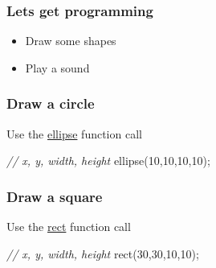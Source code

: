 \documentclass[ignorenonframetext,]{beamer}
\newenvironment{Shaded}{}{}
\newcommand{\DecValTok}[1]{\textcolor[rgb]{0.25,0.63,0.44}{{#1}}}
\newcommand{\CommentTok}[1]{\textcolor[rgb]{0.38,0.63,0.69}{\textit{{#1}}}}
\newcommand{\FunctionTok}[1]{\textcolor[rgb]{0.02,0.16,0.49}{{#1}}}
\newcommand{\NormalTok}[1]{{#1}}
\begin{document}
\begin{frame}\frametitle{Lets get programming}

\begin{itemize}
\item
  Draw some shapes
\item
  Play a sound
\end{itemize}

\end{frame}

\begin{frame}[fragile]\frametitle{Draw a circle}

Use the \href{http://processing.org/reference/ellipse\_.html}{ellipse}
function call

\begin{Shaded}
\begin{Highlighting}[]
\CommentTok{// x, y, width, height}
\FunctionTok{ellipse}\NormalTok{(}\DecValTok{10}\NormalTok{,}\DecValTok{10}\NormalTok{,}\DecValTok{10}\NormalTok{,}\DecValTok{10}\NormalTok{);}
\end{Highlighting}
\end{Shaded}

\end{frame}

\begin{frame}[fragile]\frametitle{Draw a square}

Use the \href{http://processing.org/reference/rect\_.html}{rect}
function call

\begin{Shaded}
\begin{Highlighting}[]
\CommentTok{// x, y, width, height}
\FunctionTok{rect}\NormalTok{(}\DecValTok{30}\NormalTok{,}\DecValTok{30}\NormalTok{,}\DecValTok{10}\NormalTok{,}\DecValTok{10}\NormalTok{);}
\end{Highlighting}
\end{Shaded}

\end{frame}
\end{document}

